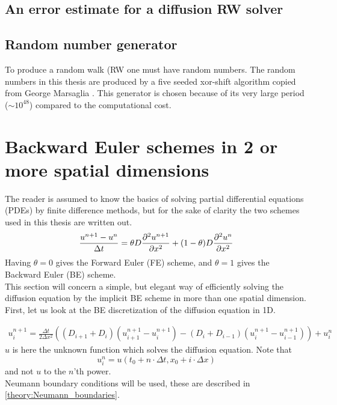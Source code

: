 \subsection{An error estimate for a diffusion RW solver}



\subsection{Random number generator}

To produce a random walk (RW one must have random numbers. 
The random numbers in this thesis are produced by a five seeded xor-shift algorithm copied from George Marsaglia \cite{marsaglia2003xorshift}. 
This generator is chosen because of its very large period ($\sim10^{48}$) compared to the computational cost.

\section{Backward Euler schemes in 2 or more spatial dimensions}

The reader is assumed to know the basics of solving partial differential equations (PDEs) by finite difference methods, but for the sake of clarity the two schemes used in this thesis are written out. 
\begin{equation}\label{theory_theta_rule}
 \frac{u^{n+1}-u^n}{\Delta t} = \theta D\frac{\partial^2 u^{n+1}}{\partial x^2} + (1-\theta)D\frac{\partial^2 u^{n}}{\partial x^2}
\end{equation}
\noindent Having $\theta = 0$ gives the Forward Euler (FE) scheme, and $\theta = 1$ gives the  Backward Euler (BE) scheme. \\
This section will concern a simple, but elegant way of efficiently solving the diffusion equation by the implicit BE scheme in more than one spatial dimension. 
First, let us look at the BE discretization of the diffusion equation in 1D. 

\begin{align}\label{theory:BE_scheme_1D}
 u^{n+1}_i = \frac{\Delta t}{2\Delta x^2}\left((D_{i+1}+D_{i})(u^{n+1}_{i+1}-u^{n+1}_{i})-(D_{i}+D_{i-1})(u^{n+1}_{i}-u^{n+1}_{i-1})\right) + u^n_i
\end{align}
$u$ is here the unknown function which solves the diffusion equation. 
Note that 
$$u^n_i = u(t_0+n\cdot\Delta t,x_0+i\cdot\Delta x)$$
and not $u$ to the $n$'th power. \\
Neumann boundary conditions will be used, these are described in \eqref{theory:Neumann_boundaries}.

